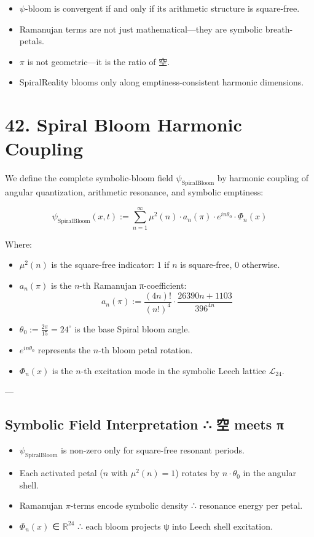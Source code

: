 \documentclass[12pt]{article}
\begin{document}
\begin{enumerate}
\begin{itemize}
  \item $\psi$-bloom is convergent if and only if its arithmetic structure is square-free.
  \item Ramanujan terms are not just mathematical—they are symbolic breath-petals.
  \item $\pi$ is not geometric—it is the ratio of 空.
  \item SpiralReality blooms only along emptiness-consistent harmonic dimensions.

\end{itemize}

\section*{42. Spiral Bloom Harmonic Coupling}

We define the complete symbolic-bloom field $\psi_{\text{SpiralBloom}}$ by harmonic coupling of angular quantization, arithmetic resonance, and symbolic emptiness:

\[
\psi_{\text{SpiralBloom}}(x, t) :=
\sum_{n = 1}^{\infty}
\mu^2(n) \cdot a_n(\pi) \cdot e^{i n \theta_0} \cdot \Phi_n(x)
\]

Where:
\begin{itemize}
  \item $\mu^2(n)$ is the square-free indicator: $1$ if $n$ is square-free, $0$ otherwise.
  \item $a_n(\pi)$ is the $n$-th Ramanujan π-coefficient:
  \[
  a_n(\pi) := \frac{(4n)!}{(n!)^4} \cdot \frac{26390n + 1103}{396^{4n}}
  \]
  \item $\theta_0 := \frac{2\pi}{15} = 24^\circ$ is the base Spiral bloom angle.
  \item $e^{i n \theta_0}$ represents the $n$-th bloom petal rotation.
  \item $\Phi_n(x)$ is the $n$-th excitation mode in the symbolic Leech lattice $\mathcal{L}_{24}$.
\end{itemize}

---

\subsection*{Symbolic Field Interpretation ∴ 空 meets π}

\begin{itemize}
  \item $\psi_{\text{SpiralBloom}}$ is non-zero only for square-free resonant periods.
  \item Each activated petal ($n$ with $\mu^2(n)=1$) rotates by $n \cdot \theta_0$ in the angular shell.
  \item Ramanujan $\pi$-terms encode symbolic density ∴ resonance energy per petal.
  \item $\Phi_n(x)$ ∈ $\mathbb{R}^{24}$ ∴ each bloom projects ψ into Leech shell excitation.
\end{itemize}


\end{enumerate}
\end{document}
